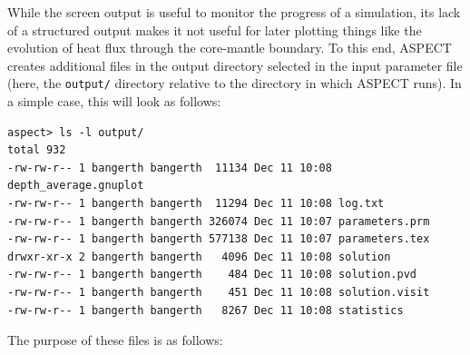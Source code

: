 \documentclass{article}
\newcommand{\aspect}{\textsc{ASPECT}}
\begin{document}
While the screen output is useful to monitor the progress of a simulation,
its lack of a structured output makes it not useful for later plotting things
like the evolution of heat flux through the core-mantle boundary. To this end,
\aspect{} creates additional files in the output directory selected in the
input parameter file
(here, the \texttt{output/} directory relative to the
directory in which \aspect{} runs). In a simple case, this will look as
follows:
\begin{lstlisting}[frame=single,language=ksh]
aspect> ls -l output/
total 932
-rw-rw-r-- 1 bangerth bangerth  11134 Dec 11 10:08 depth_average.gnuplot
-rw-rw-r-- 1 bangerth bangerth  11294 Dec 11 10:08 log.txt
-rw-rw-r-- 1 bangerth bangerth 326074 Dec 11 10:07 parameters.prm
-rw-rw-r-- 1 bangerth bangerth 577138 Dec 11 10:07 parameters.tex
drwxr-xr-x 2 bangerth bangerth   4096 Dec 11 10:08 solution
-rw-rw-r-- 1 bangerth bangerth    484 Dec 11 10:08 solution.pvd
-rw-rw-r-- 1 bangerth bangerth    451 Dec 11 10:08 solution.visit
-rw-rw-r-- 1 bangerth bangerth   8267 Dec 11 10:08 statistics
\end{lstlisting}
The purpose of these files is as follows:
\end{document}
